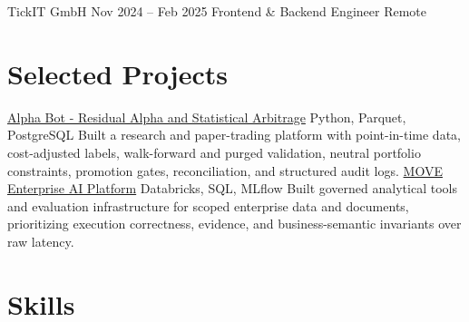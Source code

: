 \ResumeEntry
  {TickIT GmbH}
  {Nov 2024 -- Feb 2025}
  {Frontend \& Backend Engineer}
  {Remote}
\begin{ResumeItems}
\end{ResumeItems}

\section{Selected Projects}
\ProjectEntry
  {\href{https://github.com/JJCAPPE/arbitrage-model}{Alpha Bot - Residual Alpha and Statistical Arbitrage}}
  {Python, Parquet, PostgreSQL}
  {Built a research and paper-trading platform with point-in-time data, cost-adjusted labels, walk-forward and purged validation, neutral portfolio constraints, promotion gates, reconciliation, and structured audit logs.}
\ProjectEntry
  {\href{https://www.giacomocappelletto.com/projects/move}{MOVE Enterprise AI Platform}}
  {Databricks, SQL, MLflow}
  {Built governed analytical tools and evaluation infrastructure for scoped enterprise data and documents, prioritizing execution correctness, evidence, and business-semantic invariants over raw latency.}

\AthleticsAwards

\section{Skills}
